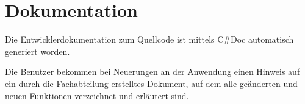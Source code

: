 \section{Dokumentation}
\label{sec:Dokumentation}

Die Entwicklerdokumentation zum Quellcode ist mittels C\#Doc automatisch generiert worden.

Die Benutzer bekommen bei Neuerungen an der Anwendung einen Hinweis auf ein durch die Fachabteilung erstelltes Dokument, auf dem alle geänderten und neuen Funktionen verzeichnet und erläutert sind. 




